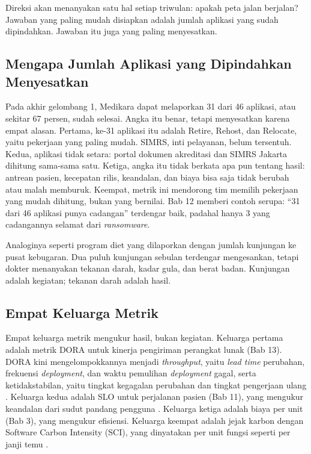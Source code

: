 Direksi akan menanyakan satu hal setiap triwulan: apakah peta jalan berjalan? Jawaban yang paling
mudah disiapkan adalah jumlah aplikasi yang sudah dipindahkan. Jawaban itu juga yang paling
menyesatkan.

\subsection{Mengapa Jumlah Aplikasi yang Dipindahkan Menyesatkan}

Pada akhir gelombang 1, Medikara dapat melaporkan 31 dari 46 aplikasi, atau sekitar 67 persen,
sudah selesai. Angka itu benar, tetapi menyesatkan karena empat alasan. Pertama, ke-31 aplikasi itu
adalah Retire, Rehost, dan Relocate, yaitu pekerjaan yang paling mudah. SIMRS, inti pelayanan,
belum tersentuh. Kedua, aplikasi tidak setara: portal dokumen akreditasi dan SIMRS Jakarta dihitung
sama-sama satu. Ketiga, angka itu tidak berkata apa pun tentang hasil: antrean pasien, kecepatan
rilis, keandalan, dan biaya bisa saja tidak berubah atau malah memburuk. Keempat, metrik ini
mendorong tim memilih pekerjaan yang mudah dihitung, bukan yang bernilai. Bab 12 memberi contoh
serupa: ``31 dari 46 aplikasi punya cadangan'' terdengar baik, padahal hanya 3 yang cadangannya
selamat dari \textit{ransomware}.

Analoginya seperti program diet yang dilaporkan dengan jumlah kunjungan ke pusat kebugaran.
Dua puluh kunjungan sebulan terdengar mengesankan, tetapi dokter menanyakan tekanan darah, kadar
gula, dan berat badan. Kunjungan adalah kegiatan; tekanan darah adalah hasil.

\subsection{Empat Keluarga Metrik}

Empat keluarga metrik mengukur hasil, bukan kegiatan. Keluarga pertama adalah metrik DORA untuk
kinerja pengiriman perangkat lunak (Bab 13). DORA kini mengelompokkannya menjadi
\textit{throughput}, yaitu \textit{lead time} perubahan, frekuensi \textit{deployment}, dan waktu
pemulihan \textit{deployment} gagal, serta ketidakstabilan, yaitu tingkat kegagalan perubahan dan
tingkat pengerjaan ulang \cite{dora-metrics}. Keluarga kedua adalah SLO untuk perjalanan pasien
(Bab 11), yang mengukur keandalan dari sudut pandang pengguna \cite{beyer2016}. Keluarga ketiga
adalah biaya per unit (Bab 3), yang mengukur efisiensi. Keluarga keempat adalah jejak karbon dengan
Software Carbon Intensity (SCI), yang dinyatakan per unit fungsi seperti per janji temu
\cite{iso21031}.

